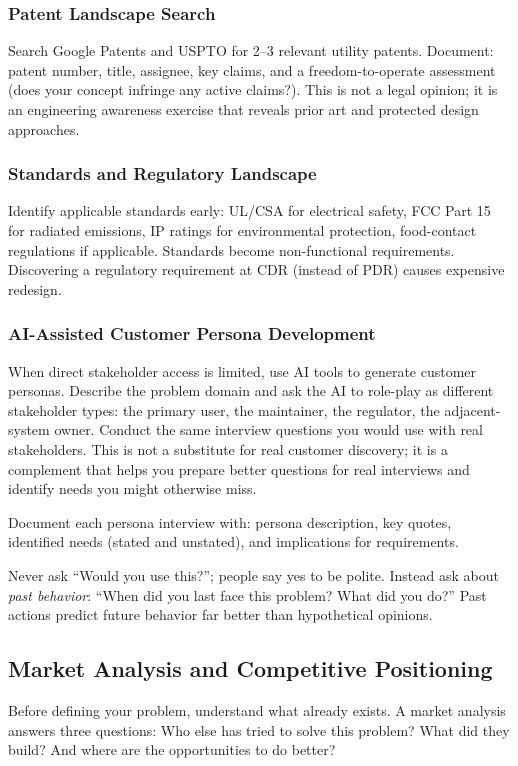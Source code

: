 \documentclass[11pt,letterpaper,twoside,openany]{book}
\begin{document}
\subsubsection{Patent Landscape Search}
Search Google Patents and USPTO for 2--3 relevant utility patents. Document: patent number, title, assignee, key claims, and a freedom-to-operate assessment (does your concept infringe any active claims?). This is not a legal opinion; it is an engineering awareness exercise that reveals prior art and protected design approaches.

\subsubsection{Standards and Regulatory Landscape}
Identify applicable standards early: UL/CSA for electrical safety, FCC Part 15 for radiated emissions, IP ratings for environmental protection, food-contact regulations if applicable. Standards become non-functional requirements. Discovering a regulatory requirement at CDR (instead of PDR) causes expensive redesign.

\subsubsection{AI-Assisted Customer Persona Development}
When direct stakeholder access is limited, use AI tools to generate customer personas. Describe the problem domain and ask the AI to role-play as different stakeholder types: the primary user, the maintainer, the regulator, the adjacent-system owner. Conduct the same interview questions you would use with real stakeholders. This is not a substitute for real customer discovery; it is a complement that helps you prepare better questions for real interviews and identify needs you might otherwise miss.

Document each persona interview with: persona description, key quotes, identified needs (stated and unstated), and implications for requirements.

\begin{tipbox}
Never ask ``Would you use this?''; people say yes to be polite. Instead ask about \emph{past behavior}: ``When did you last face this problem? What did you do?'' Past actions predict future behavior far better than hypothetical opinions.
\end{tipbox}


\subsection{Market Analysis and Competitive Positioning}
Before defining your problem, understand what already exists. A market analysis answers three questions: Who else has tried to solve this problem? What did they build? And where are the opportunities to do better?
\end{document}
